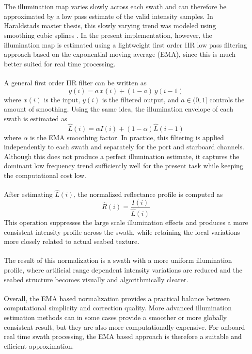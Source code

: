\\ \\
The illumination map varies slowly across each swath and can therefore be approximated by a low pass estimate of the valid intensity samples. In Haraldstads master thesis, this slowly varying trend was modeled using smoothing cubic splines \cite{side_scan_sonar_master_thesis}. In the present implementation, however, the illumination map is estimated using a lightweight first order IIR low pass filtering approach based on the exponential moving average (EMA), since this is much better suited for real time processing.
\\ \\
A general first order IIR filter can be written as
$$
    y(i) = a\,x(i) + (1-a)\,y(i-1)
$$
where $x(i)$ is the input, $y(i)$ is the filtered output, and $a \in (0,1]$ controls the amount of smoothing. Using the same idea, the illumination envelope of each swath is estimated as
$$
    \hat{L}(i) = \alpha I(i) + (1-\alpha)\hat{L}(i-1)
$$
where $\alpha$ is the EMA smoothing factor. In practice, this filtering is applied independently to each swath and separately for the port and starboard channels. Although this does not produce a perfect illumination estimate, it captures the dominant low frequency trend sufficiently well for the present task while keeping the computational cost low.
\\ \\
After estimating $\hat{L}(i)$, the normalized reflectance profile is computed as
\begin{equation}
    \hat{R}(i) = \frac{I(i)}{\hat{L}(i)}
    \label{eq:local-map-generation-reflectivity-normalization}
\end{equation}
This operation suppresses the large scale illumination effects and produces a more consistent intensity profile across the swath, while retaining the local variations more closely related to actual seabed texture.
\\ \\
The result of this normalization is a swath with a more uniform illumination profile, where artificial range dependent intensity variations are reduced and the seabed structure becomes visually and algorithmically clearer.
\\ \\
Overall, the EMA based normalization provides a practical balance between computational simplicity and correction quality. More advanced illumination estimation methods can in some cases provide a smoother or more globally consistent result, but they are also more computationally expensive. For onboard real time swath processing, the EMA based approach is therefore a suitable and efficient approximation.



